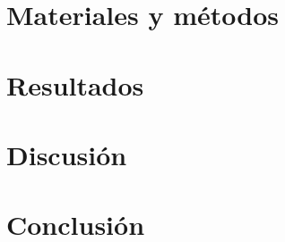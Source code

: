 \documentclass[a4paper,12pt]{article}
\begin{document}
  

  \newpage
  \section{Materiales y métodos}

  

  \newpage
  \section{Resultados}

  
  
  \newpage
  \section{Discusión}

  

  \newpage
  \section{Conclusión} 

  

  \newpage
  \printbibliography
  
\end{document}
